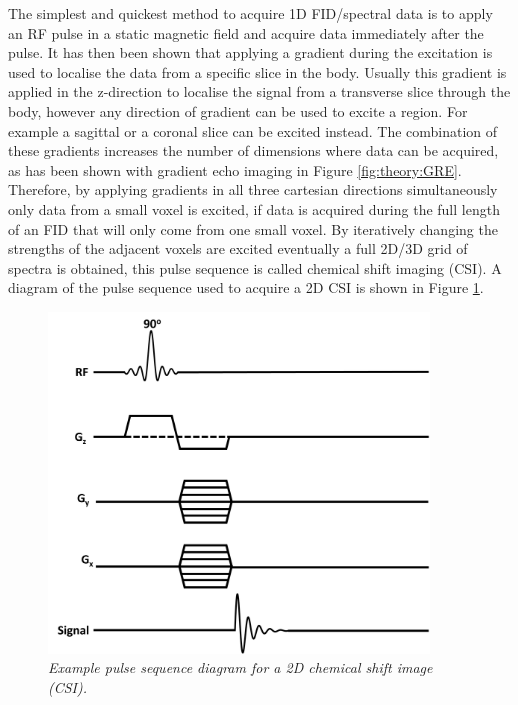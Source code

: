 \documentclass[class=article, crop=false]{standalone}
\begin{document}
The simplest and quickest method to acquire 1D FID/spectral data is to apply an RF pulse in a static magnetic field and acquire data immediately after the pulse. It has then been shown that applying a gradient during the excitation is used to localise the data from a specific slice in the body. Usually this gradient is applied in the z-direction to localise the signal from a transverse slice through the body, however any direction of gradient can be used to excite a region. For example a sagittal or a coronal slice can be excited instead. The combination of these gradients increases the number of dimensions where data can be acquired, as has been shown with gradient echo imaging in Figure \ref{fig:theory:GRE}. Therefore, by applying gradients in all three cartesian directions simultaneously only data from a small voxel is excited, if data is acquired during the full length of an FID that will only come from one small voxel. By iteratively changing the strengths of the adjacent voxels are excited eventually a full 2D/3D grid of spectra is obtained, this pulse sequence is called chemical shift imaging (CSI). A diagram of the pulse sequence used to acquire a 2D CSI is shown in Figure \ref{fig:theory:CSI}.

\begin{figure}[h]
    \centering
    \includegraphics[width=0.9\textwidth]{Figures/Theory/CSI_sequence.png}
    \caption{\textit{Example pulse sequence diagram for a 2D chemical shift image (CSI).}}
    \label{fig:theory:CSI}
\end{figure}
\end{document}
